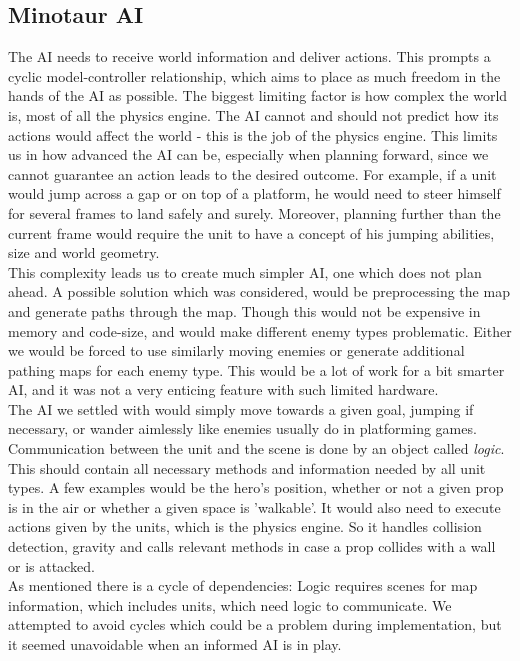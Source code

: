 \subsection{Minotaur AI} %
The AI needs to receive world information and deliver actions. This prompts a cyclic model-controller relationship, which aims to place as much freedom in the hands of the AI as possible. The biggest limiting factor is how complex the world is, most of all the physics engine. The AI cannot and should not predict how its actions would affect the world - this is the job of the physics engine. This limits us in how advanced the AI can be, especially when planning forward, since we cannot guarantee an action leads to the desired outcome. For example, if a unit would jump across a gap or on top of a platform, he would need to steer himself for several frames to land safely and surely. Moreover, planning further than the current frame would require the unit to have a concept of his jumping abilities, size and world geometry.\\
This complexity leads us to create much simpler AI, one which does not plan ahead. A possible solution which was considered, would be preprocessing the map and generate paths through the map. Though this would not be expensive in memory and code-size, and would make different enemy types problematic. Either we would be forced to use similarly moving enemies or generate additional pathing maps for each enemy type. This would be a lot of work for a bit smarter AI, and it was not a very enticing feature with such limited hardware.\\
The AI we settled with would simply move towards a given goal, jumping if necessary, or wander aimlessly like enemies usually do in platforming games.\\
Communication between the unit and the scene is done by an object called \emph{logic}. This should contain all necessary methods and information needed by all unit types. A few examples would be the hero's position, whether or not a given prop is in the air or whether a given space is 'walkable'. It would also need to execute actions given by the units, which is the physics engine. So it handles collision detection, gravity and calls relevant methods in case a prop collides with a wall or is attacked.\\
As mentioned there is a cycle of dependencies: Logic requires scenes for map information, which includes units, which need logic to communicate. We attempted to avoid cycles which could be a problem during implementation, but it seemed unavoidable when an informed AI is in play.

